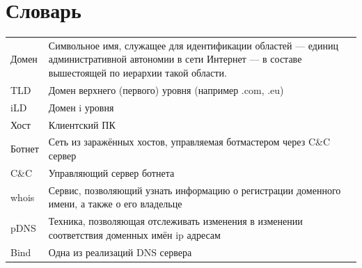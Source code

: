\documentclass[14pt]{extreport} %
\begin{document}
\section{Словарь}
\begin{tabular}{p{3cm} p{10cm}}
	\hline
	Домен   & Символьное имя, служащее для идентификации областей — единиц административной автономии в сети Интернет — в составе вышестоящей по иерархии такой области. \\ 
	TLD          & Домен верхнего (первого) уровня (например .com, .eu)                                                                                                                                                                                                           \\
	iLD          & Домен i уровня                                                                                                                                                                                                                                                                        \\
	Хост     & Клиентский ПК                                                                                                                                                                                                                                                                        \\
	Ботнет & Сеть из заражённых хостов, управляемая ботмастером через C\&C сервер                                                                                                                                                                      \\
	C\&C         & Управляющий сервер ботнета                                                                                                                                                                                                                                               \\
	whois        & Сервис, позволяющий узнать информацию о регистрации доменного имени, а также о его владельце                                                                                                                       \\
	pDNS         & Техника, позволяющая отслеживать изменения в изменении соответствия доменных имён ip адресам                                                                                                                      \\
	Bind         & Одна из реализаций DNS сервера                                                                                                                                                                                                                                            \\
	\hline
		
\end{tabular}
	
\end{document}
